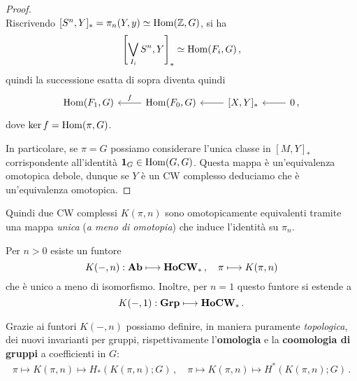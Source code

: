 \begin{lemma}
\begin{proof}
\begin{equation*}
			\end{equation*}
			Riscrivendo $[S^{n},Y]_{\ast} = \pi_{n}(Y,y) \simeq \operatorname{Hom}({\mathbb Z},G)$,
			si ha
			\begin{equation*}
				\left[\bigvee_{I_{i}} S^{n},Y \right]_{\ast} \simeq \operatorname{Hom}(F_{i},G)\,,
			\end{equation*}
			quindi la successione esatta di sopra diventa quindi
			\begin{equation*}
				\begin{tikzcd}
					\Hom(F_{1},G) 
					& \Hom(F_{0},G) \ar[l, "f"']
					& {[X,Y]_{\ast}} \ar[l]
					& 0 \,, \ar[l] 
				\end{tikzcd}
			\end{equation*}
			dove $\ker f = \operatorname{Hom}(\pi,G)$.
			
			In particolare, se $\pi = G$ possiamo considerare l'unica classe
			in $[M,Y]_{\ast}$ corrispondente all'identità ${\normalfont\textbf{1}}_{G} \in \operatorname{Hom}(G,G)$.
			Questa mappa è un'equivalenza omotopica debole,
			dunque se $Y$ è un CW complesso deduciamo che è un'equivalenza omotopica.
		\end{proof}
	\end{lemma}

	Quindi due CW complessi $K(\pi,n)$ sono omotopicamente equivalenti tramite
	una mappa \emph{unica} (\emph{a meno di omotopia}) che induce l'identità su $\pi_{n}$.
	\begin{cor}
		Per $n > 0$ esiste un funtore
		\begin{equation*}
			K(-,n) : {\normalfont\textbf{Ab}} \longmapsto {\normalfont\textbf{HoCW}}_{\ast}\,,
			\quad \pi \longmapsto K(\pi,n)
		\end{equation*}
		che è unico a meno di isomorfismo.
		Inoltre, per $n=1$ questo funtore si estende a 
		\begin{equation*}
			K(-,1) : {\normalfont\textbf{Grp}} \longmapsto {\normalfont\textbf{HoCW}}_{\ast}\,.
		\end{equation*}
	\end{cor}
	
	\begin{oss}
		Grazie ai funtori $K(-,n)$ possiamo definire, in maniera puramente
		\emph{topologica}, dei nuovi invarianti per gruppi, 
		rispettivamente l'\textbf{omologia} e la \textbf{coomologia di gruppi}
		a coefficienti in $G$:
		\begin{align*}
			\pi \longmapsto K(\pi,n) \longmapsto H_{*}(K(\pi,n);G)\,,
			\quad \pi \longmapsto K(\pi,n) \longmapsto H^{*}(K(\pi,n);G)\,.
		\end{align*}
	\end{oss}
	
